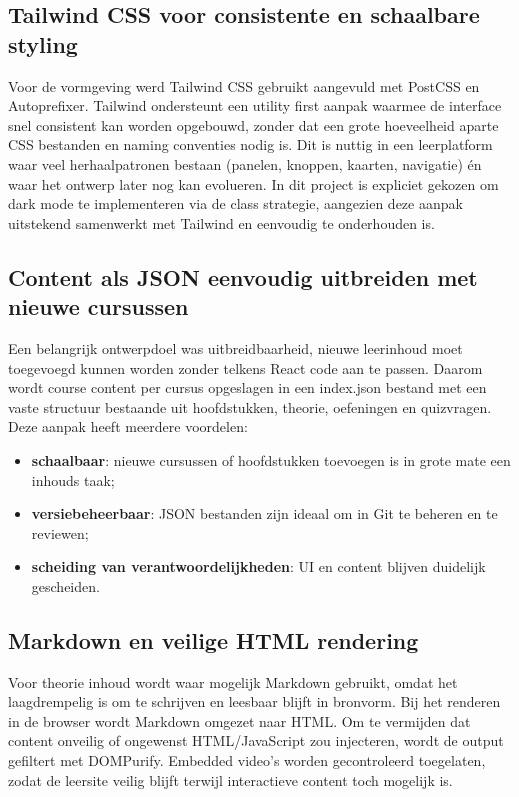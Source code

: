 \subsection{Tailwind CSS voor consistente en schaalbare styling}%
\label{sec:Tailwind-styling}
Voor de vormgeving werd Tailwind CSS gebruikt aangevuld met PostCSS en Autoprefixer.
Tailwind ondersteunt een utility first aanpak waarmee de interface snel consistent kan worden opgebouwd, zonder dat een grote hoeveelheid aparte CSS bestanden en naming conventies nodig is.
Dit is nuttig in een leerplatform waar veel herhaalpatronen bestaan (panelen, knoppen, kaarten, navigatie) én waar het ontwerp later nog kan evolueren.
In dit project is expliciet gekozen om dark mode te implementeren via de class strategie, aangezien deze aanpak uitstekend samenwerkt met Tailwind en eenvoudig te onderhouden is.

\subsection{Content als JSON eenvoudig uitbreiden met nieuwe cursussen}%
\label{sec:JSON-cursussen}
Een belangrijk ontwerpdoel was uitbreidbaarheid, nieuwe leerinhoud moet toegevoegd kunnen worden zonder telkens React code aan te passen.
Daarom wordt course content per cursus opgeslagen in een index.json bestand met een vaste structuur bestaande uit hoofdstukken, theorie, oefeningen en quizvragen.
Deze aanpak heeft meerdere voordelen:
\begin{itemize}
  \item \textbf{schaalbaar}: nieuwe cursussen of hoofdstukken toevoegen is in grote mate een inhouds taak;
  \item \textbf{versiebeheerbaar}: JSON bestanden zijn ideaal om in Git te beheren en te reviewen;
  \item \textbf{scheiding van verantwoordelijkheden}: UI en content blijven duidelijk gescheiden.
\end{itemize}

\subsection{Markdown en veilige HTML rendering}%
\label{sec:Markdown-rendering}
Voor theorie inhoud wordt waar mogelijk Markdown gebruikt, omdat het laagdrempelig is om te schrijven en leesbaar blijft in bronvorm.
Bij het renderen in de browser wordt Markdown omgezet naar HTML.
Om te vermijden dat content onveilig of ongewenst HTML/JavaScript zou injecteren, wordt de output gefiltert met DOMPurify.
Embedded video’s worden gecontroleerd toegelaten, zodat de leersite veilig blijft terwijl interactieve content toch mogelijk is.

